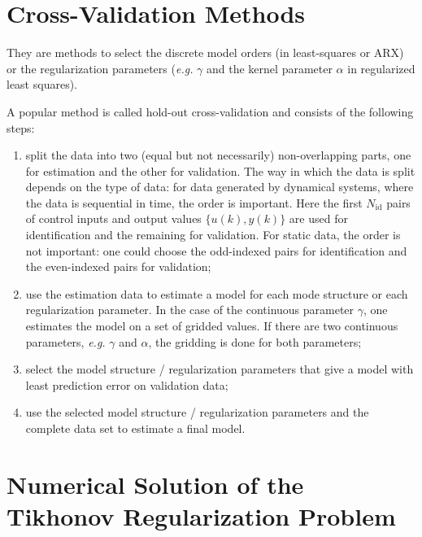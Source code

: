 \section{Cross-Validation Methods}
\label{sec:cross-validation}

They are methods to select the discrete model orders (in least-squares or ARX) or the regularization parameters (\textit{e.g.} $\gamma$ and the kernel parameter $\alpha$ in regularized least squares).

A popular method is called hold-out cross-validation and consists of the following steps:
\begin{enumerate}
\item split the data into two (equal but not necessarily) non-overlapping parts, one for estimation and the other for validation. The way in which the data is split depends on the type of data: for data generated by dynamical systems, where the data is sequential in time, the order is important. Here the first $N_\textrm{id}$ pairs of control inputs and output values $\{u(k),y(k)\}$ are used for identification and the remaining for validation. For static data, the order is not important: one could choose the odd-indexed pairs for identification and the even-indexed pairs for validation;
\item use the estimation data to estimate a model for each mode structure or each regularization parameter. In the case of the continuous parameter $\gamma$, one estimates the model on a set of gridded values. If there are two continuous parameters, \textit{e.g.} $\gamma$ and $\alpha$, the gridding is done for both parameters;
\item select the model structure / regularization parameters that give a model with least prediction error on validation data;
\item use the selected model structure / regularization parameters and the complete data set to estimate a final model.
\end{enumerate}

\section{Numerical Solution of the Tikhonov Regularization Problem}
\label{sec:numerical-tikhonov}

